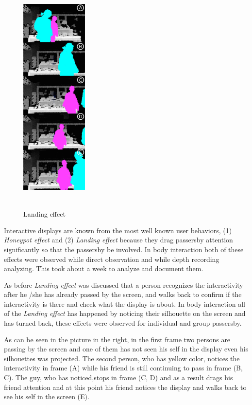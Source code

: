 \begin{figure}
  \vspace{-60pt}
  \begin{center}
    \includegraphics[width=0.3\textwidth,height=120mm]{figures/8/body_inter_findings/effects/landing}
  \end{center}
  \vspace{-20pt}
  \caption{Landing effect}
  \vspace{-10pt}
\end{figure}
Interactive displays are known from the most well known user behaviors, (1) \emph{Honeypot effect} and (2) \emph{Landing effect} because they drag passersby attention significantly so that the passersby be involved. In body interaction both of these effects were observed while direct observation and while depth recording analyzing. This took about a week to analyze and document them.

As before \emph{Landing effect} was discussed that a person recognizes the interactivity after he /she has already passed by the screen, and walks back to confirm if the interactivity is there and check what the display is about. In body interaction all of the \emph{Landing effect} has happened by noticing their silhouette on the screen and has turned back, these effects were observed for individual and group passersby.

As can be seen in the picture in the right, in the first frame two persons are passing by the screen and one of them has not seen his self in the display even his silhouettes was projected. The second person, who has yellow color, notices the interactivity in frame (A) while his friend is still continuing to pass in frame (B, C). The guy, who has noticed,stops in frame (C, D) and as a result drags his friend attention and at this point his friend notices the display and walks back to see his self in the screen (E).


